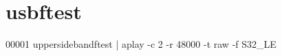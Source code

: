 \hypertarget{usbftest_source}{\section{usbftest}
\label{usbftest_source}
}

\begin{DoxyCode}
00001 uppersidebandftest | aplay -c 2 -r 48000 -t raw -f S32\_LE
\end{DoxyCode}
